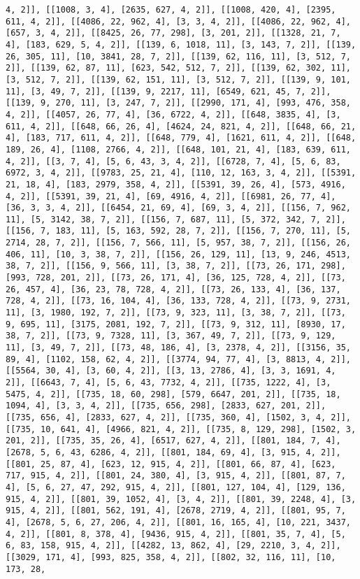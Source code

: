 \documentclass[12pt,fleqn]{article}\usepackage{../../common}
\begin{document}
\begin{verbatim}
4, 2]], [[1008, 3, 4], [2635, 627, 4, 2]], [[1008, 420, 4], [2395, 611, 4, 2]], [[4086, 22, 962, 4], [3, 3, 4, 2]], [[4086, 22, 962, 4], [657, 3, 4, 2]], [[8425, 26, 77, 298], [3, 201, 2]], [[1328, 21, 7, 4], [183, 629, 5, 4, 2]], [[139, 6, 1018, 11], [3, 143, 7, 2]], [[139, 26, 305, 11], [10, 3841, 28, 7, 2]], [[139, 62, 116, 11], [3, 512, 7, 2]], [[139, 62, 87, 11], [623, 542, 512, 7, 2]], [[139, 62, 302, 11], [3, 512, 7, 2]], [[139, 62, 151, 11], [3, 512, 7, 2]], [[139, 9, 101, 11], [3, 49, 7, 2]], [[139, 9, 2217, 11], [6549, 621, 45, 7, 2]], [[139, 9, 270, 11], [3, 247, 7, 2]], [[2990, 171, 4], [993, 476, 358, 4, 2]], [[4057, 26, 77, 4], [36, 6722, 4, 2]], [[648, 3835, 4], [3, 611, 4, 2]], [[648, 66, 26, 4], [4624, 24, 821, 4, 2]], [[648, 66, 21, 4], [183, 717, 611, 4, 2]], [[648, 779, 4], [1621, 611, 4, 2]], [[648, 189, 26, 4], [1108, 2766, 4, 2]], [[648, 101, 21, 4], [183, 639, 611, 4, 2]], [[3, 7, 4], [5, 6, 43, 3, 4, 2]], [[6728, 7, 4], [5, 6, 83, 6972, 3, 4, 2]], [[9783, 25, 21, 4], [110, 12, 163, 3, 4, 2]], [[5391, 21, 18, 4], [183, 2979, 358, 4, 2]], [[5391, 39, 26, 4], [573, 4916, 4, 2]], [[5391, 39, 21, 4], [69, 4916, 4, 2]], [[6981, 26, 77, 4], [36, 3, 3, 4, 2]], [[6454, 21, 69, 4], [69, 3, 4, 2]], [[156, 7, 962, 11], [5, 3142, 38, 7, 2]], [[156, 7, 687, 11], [5, 372, 342, 7, 2]], [[156, 7, 183, 11], [5, 163, 592, 28, 7, 2]], [[156, 7, 270, 11], [5, 2714, 28, 7, 2]], [[156, 7, 566, 11], [5, 957, 38, 7, 2]], [[156, 26, 406, 11], [10, 3, 38, 7, 2]], [[156, 26, 129, 11], [13, 9, 246, 4513, 38, 7, 2]], [[156, 9, 566, 11], [3, 38, 7, 2]], [[73, 26, 171, 298], [993, 728, 201, 2]], [[73, 26, 171, 4], [36, 125, 728, 4, 2]], [[73, 26, 457, 4], [36, 23, 78, 728, 4, 2]], [[73, 26, 133, 4], [36, 137, 728, 4, 2]], [[73, 16, 104, 4], [36, 133, 728, 4, 2]], [[73, 9, 2731, 11], [3, 1980, 192, 7, 2]], [[73, 9, 323, 11], [3, 38, 7, 2]], [[73, 9, 695, 11], [3175, 2081, 192, 7, 2]], [[73, 9, 312, 11], [8930, 17, 38, 7, 2]], [[73, 9, 7328, 11], [3, 367, 49, 7, 2]], [[73, 9, 129, 11], [3, 49, 7, 2]], [[73, 48, 186, 4], [3, 2378, 4, 2]], [[3156, 35, 89, 4], [1102, 158, 62, 4, 2]], [[3774, 94, 77, 4], [3, 8813, 4, 2]], [[5564, 30, 4], [3, 60, 4, 2]], [[3, 13, 2786, 4], [3, 3, 1691, 4, 2]], [[6643, 7, 4], [5, 6, 43, 7732, 4, 2]], [[735, 1222, 4], [3, 5475, 4, 2]], [[735, 18, 60, 298], [579, 6647, 201, 2]], [[735, 18, 1094, 4], [3, 3, 4, 2]], [[735, 656, 298], [2833, 627, 201, 2]], [[735, 656, 4], [2833, 627, 4, 2]], [[735, 360, 4], [1502, 3, 4, 2]], [[735, 10, 641, 4], [4966, 821, 4, 2]], [[735, 8, 129, 298], [1502, 3, 201, 2]], [[735, 35, 26, 4], [6517, 627, 4, 2]], [[801, 184, 7, 4], [2678, 5, 6, 43, 6286, 4, 2]], [[801, 184, 69, 4], [3, 915, 4, 2]], [[801, 25, 87, 4], [623, 12, 915, 4, 2]], [[801, 66, 87, 4], [623, 717, 915, 4, 2]], [[801, 24, 380, 4], [3, 915, 4, 2]], [[801, 87, 7, 4], [5, 6, 27, 47, 292, 915, 4, 2]], [[801, 127, 104, 4], [129, 136, 915, 4, 2]], [[801, 39, 1052, 4], [3, 4, 2]], [[801, 39, 2248, 4], [3, 915, 4, 2]], [[801, 562, 191, 4], [2678, 2719, 4, 2]], [[801, 95, 7, 4], [2678, 5, 6, 27, 206, 4, 2]], [[801, 16, 165, 4], [10, 221, 3437, 4, 2]], [[801, 8, 378, 4], [9436, 915, 4, 2]], [[801, 35, 7, 4], [5, 6, 83, 158, 915, 4, 2]], [[4282, 13, 862, 4], [29, 2210, 3, 4, 2]], [[3029, 171, 4], [993, 825, 358, 4, 2]], [[802, 32, 116, 11], [10, 173, 28, 
\end{verbatim}
\end{document}
